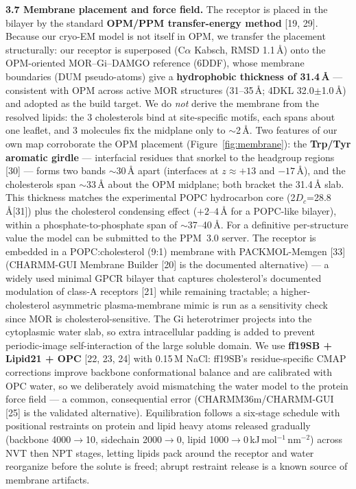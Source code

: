 \documentclass[11pt]{article}
\newcommand{\Ang}{\AA}
\begin{document}
\textbf{3.7 Membrane placement and force field.} The receptor is placed in the bilayer by the standard
\textbf{OPM/PPM transfer-energy method} [19, 29]. Because our cryo-EM model is not itself in OPM, we
transfer the placement structurally: our receptor is superposed (C$\alpha$ Kabsch, RMSD 1.1\,\Ang) onto
the OPM-oriented MOR--Gi--DAMGO reference (6DDF), whose membrane boundaries (DUM pseudo-atoms) give a
\textbf{hydrophobic thickness of 31.4\,\Ang} --- consistent with OPM across active MOR structures
(31--35\,\Ang; 4DKL 32.0$\pm$1.0\,\Ang) and adopted as the build target. We do \emph{not} derive the
membrane from the resolved lipids: the 3 cholesterols bind at site-specific motifs, each spans about one
leaflet, and 3 molecules fix the midplane only to $\sim$2\,\Ang. Two features of our own map corroborate
the OPM placement (Figure~\ref{fig:membrane}): the \textbf{Trp/Tyr aromatic girdle} --- interfacial
residues that snorkel to the headgroup regions [30] --- forms two bands $\sim$30\,\Ang{} apart (interfaces
at $z\approx+13$ and $-17$\,\Ang), and the cholesterols span $\sim$33\,\Ang{} about the OPM midplane; both
bracket the 31.4\,\Ang{} slab. This thickness matches the experimental POPC hydrocarbon core
(2$D_c$=28.8\,\Ang [31]) plus the cholesterol condensing effect ($+2$--$4$\,\Ang{} for a POPC-like
bilayer), within a phosphate-to-phosphate span of $\sim$37--40\,\Ang. For a definitive per-structure
value the model can be submitted to the PPM~3.0 server. The receptor is embedded in a
POPC:cholesterol (9:1) membrane with PACKMOL-Memgen [33] (CHARMM-GUI Membrane Builder [20] is the
documented alternative) --- a
widely used minimal GPCR bilayer that captures cholesterol's documented modulation of class-A receptors
[21] while remaining tractable; a higher-cholesterol asymmetric plasma-membrane mimic
is run as a sensitivity check since MOR is cholesterol-sensitive. The Gi heterotrimer projects into the
cytoplasmic water slab, so extra intracellular padding is added to prevent periodic-image
self-interaction of the large soluble domain. We use \textbf{ff19SB + Lipid21 + OPC}
[22, 23, 24] with 0.15\,M NaCl: ff19SB's residue-specific
CMAP corrections improve backbone conformational balance and are calibrated with OPC water, so we
deliberately avoid mismatching the water model to the protein force field --- a common, consequential
error (CHARMM36m/CHARMM-GUI [25] is the validated alternative). Equilibration follows a
six-stage schedule with positional restraints on protein and lipid heavy atoms released gradually
(backbone 4000$\rightarrow$10, sidechain 2000$\rightarrow$0, lipid 1000$\rightarrow$0\,kJ\,mol$^{-1}$\,nm$^{-2}$)
across NVT then NPT stages, letting lipids pack around the receptor and water reorganize before the
solute is freed; abrupt restraint release is a known source of membrane artifacts.
\end{document}
